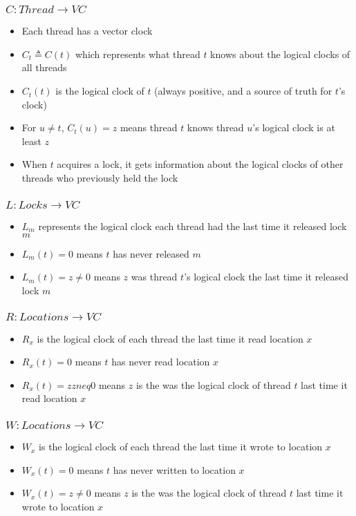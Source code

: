 \subsubsection{$C: Thread \to VC$}
\begin{itemize}
	\item Each thread has a vector clock
	\item $C_t \triangleq C(t)$ which represents what thread $t$ knows about the logical clocks of all threads
	\item $C_t(t)$ is the logical clock of $t$ (always positive, and a source of truth for $t$'s clock)
	\item For $u \neq t$, $C_t(u)=z$ means thread $t$ knows thread $u$'s logical clock is at least $z$
	\item When $t$ acquires a lock, it gets information about the logical clocks of other threads who previously held the lock
\end{itemize}

\subsubsection{$L: Locks \to VC$}
\begin{itemize}
	\item $L_m$ represents the logical clock each thread had the last time it released lock $m$
	\item $L_m(t) = 0$ means $t$ has never released $m$
	\item $L_m(t) = z \neq 0$ means $z$ was thread $t$'s logical clock the last time it released lock $m$
\end{itemize}

\subsubsection{$R: Locations \to VC$}
\begin{itemize}
	\item $R_x$ is the logical clock of each thread the last time it read location $x$
	\item $R_x(t) = 0$ means $t$ has never read location $x$
	\item $R_x(t) = z zneq 0$ means $z$ is the was the logical clock of thread $t$ last time it read location $x$
\end{itemize}

\subsubsection{$W: Locations \to VC$}
\begin{itemize}
	\item $W_x$ is the logical clock of each thread the last time it wrote to location $x$
	\item $W_x(t) = 0$ means $t$ has never written to location $x$
	\item $W_x(t) = z \neq 0$ means $z$ is the was the logical clock of thread $t$ last time it wrote to location $x$
\end{itemize}

